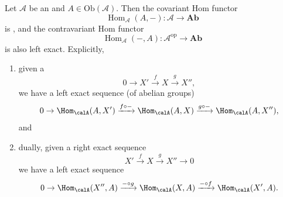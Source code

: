 \begin{proposition} \label{proposition:Hom_functors_on_abelian_categories_are_left_exact}
    Let $\mathcal{A}$ be an  and $A \in \mathrm{Ob}(\mathcal{A})$. Then the covariant Hom functor
    $$\operatorname{Hom}_{\mathcal{A}}(A,-): \mathcal{A} \to \mathbf{Ab}$$
    is , and the contravariant Hom functor
    $$\operatorname{Hom}_{\mathcal{A}}(-,A): \mathcal{A}^{\mathrm{op}} \to \mathbf{Ab}$$
     is also left exact. Explicitly, 
    \begin{enumerate}
        \item given a 
        $$0 \to X' \xrightarrow{f} X \xrightarrow{g} X'', $$
        we have a left exact sequence (of abelian groups)
        $$0 \to \Hom_\calA(A, X') \xrightarrow{f \circ -} \Hom_{\calA}(A, X) \xrightarrow{g \circ -} \Hom_{\calA}(A, X''), $$
        and 
        \item dually, given a right exact sequence
        $$X' \xrightarrow{f} X \xrightarrow{g} X'' \to 0$$
        we have a left exact sequence
        $$0 \to \Hom_\calA(X'', A) \xrightarrow{- \circ g} \Hom_{\calA}(X, A) \xrightarrow{- \circ f} \Hom_{\calA}(X', A).$$
    \end{enumerate}
\end{proposition}
